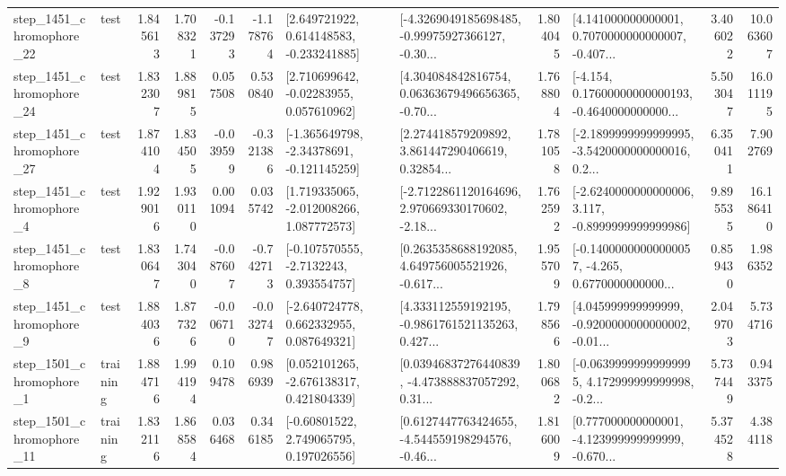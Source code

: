 \begin{tabular}{llrrrrllrlrr}
 step\_1451\_chromophore\_22 &      test &      1.845613 &    1.708321 &     -0.137293 & -1.178764 &    [2.649721922, 0.614148583, -0.233241885] &  [-4.3269049185698485, -0.99975927366127, -0.30... &       1.804045 &  [4.141000000000001, 0.7070000000000007, -0.407... &            3.406022 &         10.063607 \\
 step\_1451\_chromophore\_24 &      test &      1.832307 &    1.889815 &      0.057508 &  0.530840 &     [2.710699642, -0.02283955, 0.057610962] &  [4.304084842816754, 0.06363679496656365, -0.70... &       1.768804 &  [-4.154, 0.17600000000000193, -0.4640000000000... &            5.503047 &         16.011195 \\
 step\_1451\_chromophore\_27 &      test &      1.874104 &    1.834505 &     -0.039599 & -0.321386 &   [-1.365649798, -2.34378691, -0.121145259] &  [2.274418579209892, 3.861447290406619, 0.32854... &       1.781058 &  [-2.1899999999999995, -3.5420000000000016, 0.2... &            6.350411 &          7.902769 \\
  step\_1451\_chromophore\_4 &      test &      1.929016 &    1.930110 &      0.001094 &  0.035742 &    [1.719335065, -2.012008266, 1.087772573] &  [-2.7122861120164696, 2.970669330170602, -2.18... &       1.762592 &  [-2.6240000000000006, 3.117, -0.8999999999999986] &            9.895535 &         16.186410 \\
  step\_1451\_chromophore\_8 &      test &      1.830647 &    1.743040 &     -0.087607 & -0.742713 &     [-0.107570555, -2.7132243, 0.393554757] &  [0.2635358688192085, 4.649756005521926, -0.617... &       1.955709 &  [-0.14000000000000057, -4.265, 0.6770000000000... &            0.859430 &          1.986352 \\
  step\_1451\_chromophore\_9 &      test &      1.884036 &    1.877326 &     -0.006710 & -0.032747 &    [-2.640724778, 0.662332955, 0.087649321] &  [4.333112559192195, -0.9861761521135263, 0.427... &       1.798566 &  [4.045999999999999, -0.9200000000000002, -0.01... &            2.049703 &          5.734716 \\
  step\_1501\_chromophore\_1 &  training &      1.884716 &    1.994194 &      0.109478 &  0.986939 &    [0.052101265, -2.676138317, 0.421804339] &  [0.03946837276440839, -4.473888837057292, 0.31... &       1.800682 &  [-0.06399999999999995, 4.172999999999998, -0.2... &            5.737449 &          0.943375 \\
 step\_1501\_chromophore\_11 &  training &      1.832116 &    1.868584 &      0.036468 &  0.346185 &     [-0.60801522, 2.749065795, 0.197026556] &  [0.6127447763424655, -4.544559198294576, -0.46... &       1.816009 &  [0.777000000000001, -4.123999999999999, -0.670... &            5.374528 &          4.384118 \\

\end{tabular}
